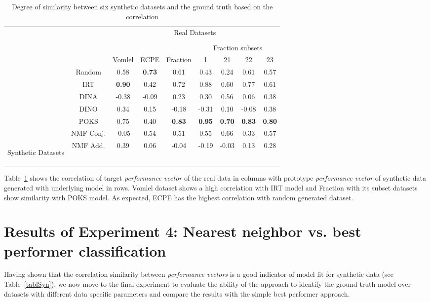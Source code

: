 \begin{table}[h]
 \center
\begin{tabular}{c|c|c|c|c|c|c|c|c|}

\multicolumn{2}{c}{}&\multicolumn{7}{c}{Real Datasets}\tabularnewline   
\multicolumn{9}{c}{}\tabularnewline   
\cline{6-9}
\multicolumn{5}{c|}{}&\multicolumn{4}{c|}{Fraction subsets}   \tabularnewline   
\cline{3-9} 
\multicolumn{2}{c|}{}   & Vomlel &ECPE &Fraction &1&21&22&23\tabularnewline
\cline{2-9}
\cline{2-9}
&Random & 0.58 &\textbf {0.73} & 0.61   & 0.43 & 0.24 & 0.61 & 0.57 \tabularnewline
\cline{2-9}
&IRT & \textbf {0.90} & 0.42 & 0.72   & 0.88 & 0.60 & 0.77 & 0.61 \tabularnewline
\cline{2-9}
&DINA & -0.38  & -0.09 &   0.23 &   0.30 & 0.56 & 0.06 & 0.38 \tabularnewline
\cline{2-9}
&DINO & 0.34 & 0.15  &  -0.18 &  -0.31 & 0.10 & -0.08 & 0.38 \tabularnewline
\cline{2-9}
&POKS & 0.75 &0.40  &  \textbf {0.83}  &  \textbf {0.95} &\textbf {0.70} & \textbf {0.83} & \textbf {0.80}\tabularnewline
\cline{2-9}
 &NMF Conj. & -0.05 & 0.54  & 0.51   & 0.55  & 0.66 & 0.33 & 0.57\tabularnewline
\cline{2-9}
\multicolumn{1}{c|}{\multirow{-7}{*}{\begin{sideways}Synthetic Datasets\end{sideways}}}&NMF Add. & 0.39 &0.06   & -0.04   & -0.19 & -0.03 & 0.13 & 0.28\tabularnewline
\cline{2-9}
\end{tabular}
\caption{Degree of similarity between six synthetic datasets and the ground truth based on the correlation}
\label{tablSynReal}
\end{table}

Table~\ref{tablSynReal} shows the correlation of target \textit{performance vector} of the real data in columns with prototype \textit{performance vector} of synthetic data generated with underlying model in rows. Vomlel dataset shows a high correlation with IRT model and Fraction with its subset datasets show similarity with POKS model. As expected, ECPE has the highest correlation with random generated dataset.


\section{Results of Experiment 4: Nearest neighbor vs. best performer classification} 
\label{GeneralityRes}

Having shown that the correlation similarity between \textit{performance vectors} is a good indicator of model fit for synthetic data (see Table~\ref{tablSyn}), we now move to the final experiment to evaluate the ability of the approach to identify the ground truth model over datasets with different data specific parameters and compare the results with the simple best performer approach.

